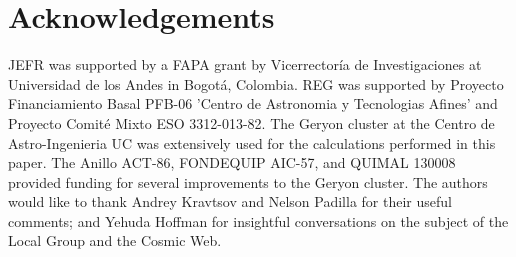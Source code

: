 \documentclass{emulateapj}
\begin{document}
\section*{Acknowledgements}
JEFR was supported by a FAPA grant by Vicerrector\'ia de
Investigaciones at Universidad de los Andes in Bogot\'a, Colombia.
REG was supported by Proyecto Financiamiento Basal PFB-06 'Centro de
Astronomia y Tecnologias Afines' and Proyecto Comit\'e Mixto ESO
3312-013-82. 
The Geryon cluster at the Centro de Astro-Ingenieria UC was
extensively used for the calculations performed in this paper. The
Anillo ACT-86, FONDEQUIP AIC-57, and QUIMAL 130008 provided funding
for several improvements to the Geryon cluster. 
The authors would like to thank Andrey Kravtsov and Nelson Padilla
for their useful comments; and Yehuda Hoffman for insightful
conversations on the subject of the Local Group and the Cosmic Web. 

% 
\end{document}
